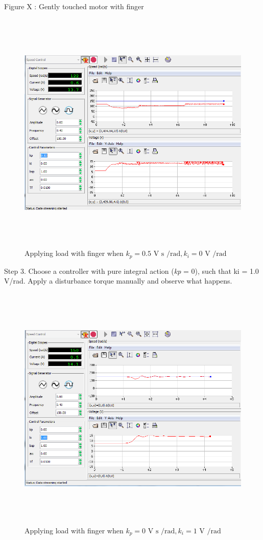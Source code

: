 \documentclass[]{article}
\begin{document}
Figure X : Gently touched motor with finger

\begin{figure}\includegraphics[width=6.50000in,height=4.62500in]{media/image19.png} \caption{Applying load with finger when $k_p = \text{0.5 V s /rad}, k_i = \text{0 V /rad}$} \end{figure}

Step 3. Choose a controller with pure integral action (\emph{kp} = 0),
such that ki = 1.0 V/rad. Apply a disturbance torque manually and
observe what happens.

\begin{figure}\includegraphics[width=6.50000in,height=4.68056in]{media/image33.png} \caption{Applying load with finger when $k_p = \text{0 V s /rad}, k_i = \text{1 V /rad}$} \end{figure}
\end{document}
